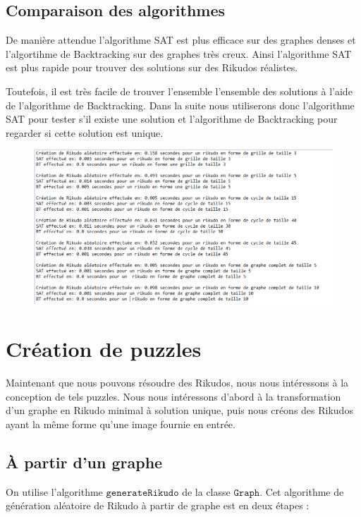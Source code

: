 \documentclass[11pt, a4paper]{article}
\begin{document}
\subsection{Comparaison des algorithmes}

De manière attendue l'algorithme SAT est plus efficace sur des graphes denses et l'algortihme de Backtracking sur des graphes très creux. Ainsi l'algorithme SAT est plus rapide pour trouver des solutions sur des Rikudos réalistes. 

Toutefois, il est très facile de trouver l'ensemble l'ensemble des solutions à l'aide de l'algorithme de Backtracking. Dans la suite nous utiliserons donc l'algorithme SAT pour tester s'il existe une solution et l'algorithme de Backtracking pour regarder si cette solution est unique. 

\begin{figure}[h]
	\centering
	\includegraphics[scale=0.7]{RunTimeRikudo.png}
\end{figure}


\section{Création de puzzles}

Maintenant que nous pouvons résoudre des Rikudos, nous nous intéressons à la conception de tels puzzles. Nous nous intéressons d'abord à la transformation d'un graphe en Rikudo minimal à solution unique, puis nous créons des Rikudos ayant la même forme qu'une image fournie en entrée.

\subsection{À partir d'un graphe}

On utilise l'algorithme $\mathtt{generateRikudo}$ de la classe $\mathtt{Graph}$. Cet algorithme de génération aléatoire de Rikudo à partir de graphe est en deux étapes :
\end{document}
